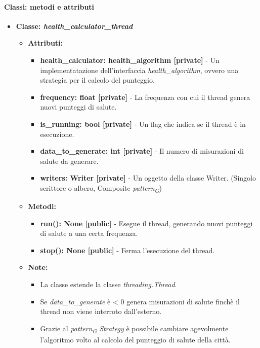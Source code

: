 \paragraph*{Classi: metodi e attributi}
\begin{itemize}
    \item{\textbf{Classe: \textit{health\_calculator\_thread}}}
    \begin{itemize}
    \item\textbf{Attributi:}
        \begin{itemize}
        \item \textbf{health\_calculator: health\_algorithm [private]} - Un implementatazione dell'interfaccia \textit{health\_algorithm}, ovvero una strategia per il calcolo del punteggio.
        \item \textbf{frequency: float [private]} - La frequenza con cui il thread genera nuovi punteggi di salute.
        \item \textbf{is\_running: bool [private]} - Un flag che indica se il thread è in esecuzione.
        \item \textbf{data\_to\_generate: int [private]} - Il numero di misurazioni di salute da generare.
        \item \textbf{writers: Writer [private]} - Un oggetto della classe Writer. (Singolo scrittore o albero, Composite \textit{pattern}\textsubscript{\textit{G}})
    \end{itemize}
    \item \textbf{Metodi: }
    \begin{itemize}
        \item \textbf{run(): None [public]} - Esegue il thread, generando nuovi punteggi di salute a una certa frequenza.
        \item \textbf{stop(): None [public]} - Ferma l'esecuzione del thread.
    \end{itemize}
    \item\textbf{Note:}
        \begin{itemize}
            \item La classe estende la classe \textit{threading.Thread}.
            \item Se \textit{data\_to\_generate} è < 0 genera misurazioni di salute finchè il thread non viene interroto dall'esterno.
            \item   Grazie al \textit{pattern}\textsubscript{\textit{G}} \textit{Strategy} è possibile cambiare agevolmente l'algoritmo volto al calcolo del punteggio di salute della città.
        \end{itemize}
    \end{itemize}
\end{itemize}

